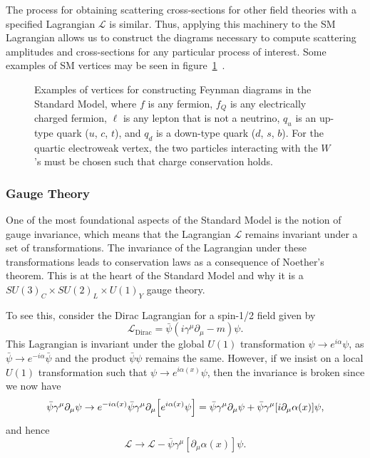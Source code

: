 The process for obtaining scattering cross-sections for other field theories with a specified Lagrangian $\mathcal{L}$ is similar.
Thus, applying this machinery to the SM Lagrangian allows us to construct the diagrams necessary to compute scattering amplitudes and cross-sections for any particular process of interest. Some examples of SM vertices may be seen in figure~\ref{fig:SMVert}~\cite{Romao_2012}.

\begin{figure}[htbp]
  \centering
  
  \caption{
    Examples of vertices for constructing Feynman diagrams in the Standard Model, where $f$ is any fermion, $f_Q$ is any electrically charged fermion, $\ell$ is any lepton that is not a neutrino, $q_u$ is an up-type quark ($u$, $c$, $t$), and $q_d$ is a down-type quark ($d$, $s$, $b$).
    For the quartic electroweak vertex, the two particles interacting with the $W$'s must be chosen such that charge conservation holds.
  }
  \label{fig:SMVert}
\end{figure}

\subsubsection{Gauge Theory}

One of the most foundational aspects of the Standard Model is the notion of gauge invariance, which means that the Lagrangian $\mathcal{L}$ remains invariant under a set of transformations.
The invariance of the Lagrangian under these transformations leads to conservation laws as a consequence of Noether's theorem.
This is at the heart of the Standard Model and why it is a $SU(3)_C\times SU(2)_L\times U(1)_Y$ gauge theory.

To see this, consider the Dirac Lagrangian for a spin-1/2 field given by
\begin{equation}
  \mathcal{L}_\mathrm{Dirac}=\bar{\psi}(i\gamma^\mu\partial_\mu-m)\psi.
\end{equation}
This Lagrangian is invariant under the global $U(1)$ transformation $\psi\to e^{i\alpha}\psi$, as $\bar{\psi}\to e^{-i\alpha}\bar{\psi}$ and the product $\bar{\psi}\psi$ remains the same.
However, if we insist on a local $U(1)$ transformation such that $\psi\to e^{i\alpha(x)}\psi$, then the invariance is broken since we now have
\begin{equation}
  \bar{\psi}\gamma^\mu\partial_\mu\psi\to e^{-i\alpha(x)}\bar{\psi}\gamma^\mu\partial_\mu\bqty{e^{i\alpha(x)}\psi}=\bar{\psi}\gamma^\mu\partial_\mu\psi+\bar{\psi}\gamma^\mu[i\partial_\mu\alpha(x)]\psi,
\end{equation}
and hence
\begin{equation}
  \mathcal{L}\to\mathcal{L}-\bar{\psi}\gamma^\mu[\partial_\mu\alpha(x)]\psi.
\end{equation}

